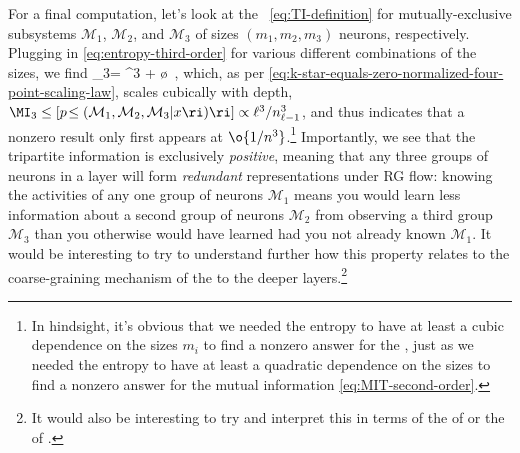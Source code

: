 For a final computation, let's look at the ~\eqref{eq:TI-definition} for mutually-exclusive subsystems $\mathcal{M}_1$, $\mathcal{M}_2$, and $\mathcal{M}_3$ of sizes $(m_1, m_2, m_3)$ neurons, respectively. Plugging in \eqref{eq:entropy-third-order} for various different combinations of the sizes, we find
\be\label{eq:TIM-third-order}
\MI_{3}=  ^3 +
 \o{}\, ,
\ee
which, as per \eqref{eq:k-star-equals-zero-normalized-four-point-scaling-law}, scales cubically with depth, $\MI_{3}\le[p\!\le( \mathcal{M}_1 , \mathcal{M}_2, \mathcal{M}_3 \vert x\ri)\ri] \propto \ell^3/n_{\ell-1}^3$, and thus indicates that a nonzero result only first appears at $\o{1/n^3}$.\footnote{
    In hindsight, it's obvious that we needed the entropy to have at least a cubic dependence on the 
    sizes $m_i$ to find a nonzero answer for the , just as we needed the entropy to have at least a quadratic dependence on the sizes to find a nonzero answer for the mutual information \eqref{eq:MIT-second-order}.
}
Importantly, we see that the tripartite information is exclusively \emph{positive}, meaning that any three groups of neurons in a layer will form \emph{redundant} representations under RG flow: knowing the activities of any one group of neurons $\mathcal{M}_1$ means you would learn less information about a second group of neurons $\mathcal{M}_2$ from observing a third group $\mathcal{M}_3$ than you otherwise would have learned had you not already known $\mathcal{M}_1$. It would be interesting to try to understand further how this property relates to the coarse-graining mechanism of the  to the deeper layers.\footnote{It would also be interesting to try and interpret this in terms of the  of \cite{brain-damage} or the  of \cite{frankle2018the}.}
































